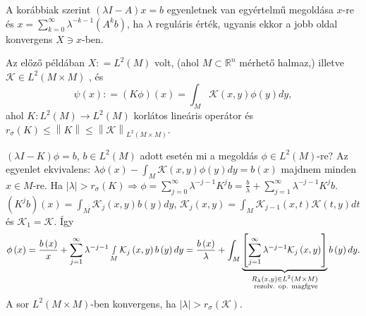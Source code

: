 \documentclass[12pt,a4paper]{scrartcl}
\begin{document}
A korábbiak szerint \(\left( {\lambda I - A} \right)x = b\) egyenletnek
van egyértelmű megoldása \(x\)-re és
\(x = {\sum\limits_{k = 0}^{\infty}{\lambda^{- k - 1}\left( {A^{k}b} \right)}}\),
ha \(\lambda\) reguláris érték, ugyanis ekkor a jobb oldal konvergens
\(X \ni x\)-ben.

Az előző példában \(X: = L^{2}\left( M \right)\) volt, (ahol
\(M \subset {\mathbb{R}}^{n}\) mérhető halmaz,) illetve
\(\mathcal{K} \in L^{2}\left( {M \times M} \right)\) , és
\[\psi\left( x \right): = \left( {K\phi} \right)\left( x \right) = {\int_{M}{\mathcal{K}\left( {x,y} \right)\phi\left( y \right)dy}},\]
ahol
\(\left. K:L^{2}\left( M \right)\rightarrow L^{2}\left( M \right) \right.\)
korlátos lineáris operátor és
\(r_{\sigma}\left( K \right) \leq \left\| K \right\| \leq \left\| \mathcal{K} \right\|_{L^{2}{({M \times M})}}\).

\(\left( {\lambda I - K} \right)\phi = b\),
\(b \in L^{2}\left( M \right)\) adott esetén mi a megoldás
\(\phi \in L^{2}\left( M \right)\)-re? Az egyenlet ekvivalens:
\(\lambda\phi\left( x \right) - {\int_{M}{\mathcal{K}\left( {x,y} \right)\phi\left( y \right)dy}} = b\left( x \right)\)
majdnem minden \(x \in M\)-re. Ha
\(\left. \left| \lambda \right| > r_{\sigma}\left( K \right)\Rightarrow\phi = {\sum\limits_{j = 0}^{\infty}{\lambda^{- j - 1}K^{j}b}} = \frac{b}{\lambda} + {\sum\limits_{j = 1}^{\infty}{\lambda^{- j - 1}K^{j}b}} \right.\).
\(\left( {K^{j}b} \right)\left( x \right) = {\int_{M}{\mathcal{K}_{j}\left( {x,y} \right)b\left( y \right)dy}}\),
\(\mathcal{K}_{j}\left( {x,y} \right) = {\int_{M}{\mathcal{K}_{j - 1}\left( {x,t} \right)\mathcal{K}\left( {t,y} \right)dt}}\)
és \(\mathcal{K}_{1} = \mathcal{K}\). Így
\[\phi \left( x \right) = \frac{{b\left( x \right)}}{x} + \mathop \sum \limits_{j = 1}^\infty  {\lambda ^{ - j - 1}}\mathop \smallint \limits_M {\mathcal{K}_j}\left( {x,y} \right)b\left( y \right)dy = \frac{{b\left( x \right)}}{\lambda } + \int_M {\underbrace {\left[ {\mathop \sum \limits_{j = 1}^\infty  {\lambda ^{ - j - 1}}{\mathcal{K}_j}\left( {x,y} \right)} \right]}_{\substack{{R_\lambda }\left( {x,y} \right) \in {L^2}\left( {M \times M} \right) \\ {\text{ rezolv. op. magfgve}}}}b\left( y \right)dy} .\]
A sor \(L^{2}\left( {M \times M} \right)\)-ben konvergens, ha
\(\left| \lambda \right| > r_{\sigma}\left( \mathcal{K} \right)\).
\end{document}
